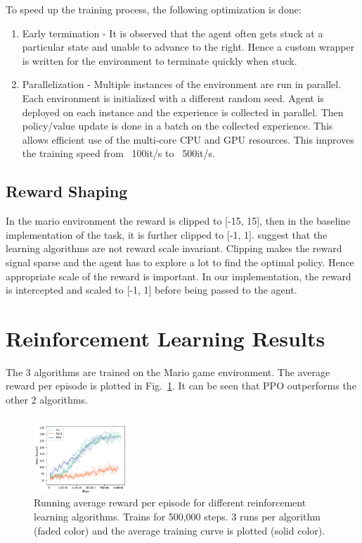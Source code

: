 \documentclass[conference]{IEEEtran}
\begin{document}
To speed up the training process, the following optimization is done:
\begin{enumerate}
    \item Early termination - It is observed that the agent often gets stuck at a particular state and unable to advance to the right. Hence a custom wrapper is written for the environment to terminate quickly when stuck.
    \item Parallelization - Multiple instances of the environment are run in parallel. Each environment is initialized with a different random seed. Agent is deployed on each instance and the experience is collected in parallel. Then policy/value update is done in a batch on the collected experience. This allows efficient use of the multi-core CPU and GPU resources. This improves the training speed from ~100it/s to ~500it/s.
\end{enumerate}

\subsection{Reward Shaping}

In the mario environment the reward is clipped to [-15, 15], then in the baseline implementation of the task, it is further clipped to [-1, 1]. \cite{vanhasseltLearningValuesMany2016} suggest that the learning algorithms are not reward scale invariant. Clipping makes the reward signal sparse and the agent has to explore a lot to find the optimal policy. Hence appropriate scale of the reward is important. In our implementation, the reward is intercepted and scaled to [-1, 1] before being passed to the agent.

\section{Reinforcement Learning Results}

The 3 algorithms are trained on the Mario game environment. The average reward per episode is plotted in Fig.~\ref{fig:compare_algorithms}. It can be seen that PPO outperforms the other 2 algorithms.

\begin{figure}
    \centering
    \includegraphics[width=0.34\textwidth]{compare_alg.png}
    \caption{Running average reward per episode for different reinforcement learning algorithms. Trains for 500,000 steps. 3 runs per algorithm (faded color) and the average training curve is plotted (solid color).}
    \label{fig:compare_algorithms}
\end{figure}
\end{document}
